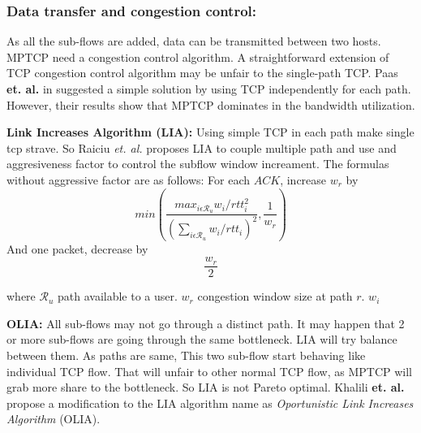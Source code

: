 %
%

\subsubsection{Data transfer and congestion control:}
As all the sub-flows are added, data can be transmitted between two hosts. MPTCP need a congestion control algorithm. A straightforward extension of TCP congestion control algorithm may be unfair to the single-path TCP.
Paas \textbf{et. al.} in \cite{PaaschMptcp} suggested a simple solution by using TCP independently for each path. However, their results show that MPTCP dominates in the bandwidth utilization.

\textbf{Link Increases Algorithm (LIA):} Using simple TCP in each path make single tcp strave. So Raiciu \textit{et. al.} proposes LIA to couple multiple path and use and aggresiveness factor to control the subflow window increament\cite{LIARFC6356}. The formulas without aggressive factor are as follows:
For each $ACK$, increase $w_r$ by 
$$min\left( \frac{max_{i\epsilon \mathcal{R}_u} w_i/rtt_i^2}{\left(\sum_{i\epsilon \mathcal{R}_u}w_i/rtt_i\right)^2}, \frac{1}{w_r}\right) $$
And one packet, decrease by $$\frac{w_r}{2}$$

where $\mathcal{R}_u$ path available to a user. $w_r$ congestion window size at path $r$.  $w_i$

\textbf{OLIA:} All sub-flows may not go through a distinct path. It may happen that 2 or more sub-flows are going through the same bottleneck. LIA will try balance between them. As paths are same, This two sub-flow start behaving like individual TCP flow. That will unfair to other normal TCP flow, as MPTCP will grab more share to the bottleneck. So LIA is not Pareto optimal\cite{OLIARamin2012}. Khalili \textbf{et. al.} propose a modification to the LIA algorithm name as \textit{Oportunistic Link Increases Algorithm} (OLIA).

